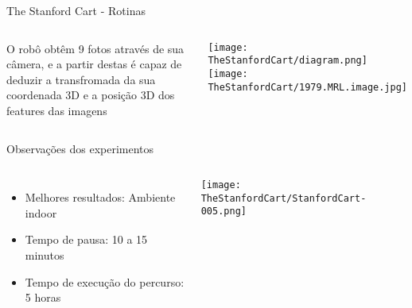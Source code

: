 \begin{frame}[t]{The Stanford Cart - Rotinas}
    \begin{columns}
        O robô obtêm 9 fotos através de sua câmera, e a partir destas é capaz de
        deduzir a transfromada da sua coordenada 3D e a posição 3D dos features das imagens

        \vspace*{0.8cm}
        \texttt{[image: TheStanfordCart/diagram.png]}
        \vspace*{0.3cm}
            \texttt{[image: TheStanfordCart/1979.MRL.image.jpg]}
            \end{columns}
\end{frame}
\begin{frame}[c]{Observações dos experimentos}
    \begin{columns}
        \begin{itemize} 
            \item Melhores resultados: Ambiente indoor
            \item Tempo de pausa: 10 a 15 minutos
            \item Tempo de execução do percurso: 5 horas
        \end{itemize}
            \centering
            \texttt{[image: TheStanfordCart/StanfordCart-005.png]}
            \end{columns}
\end{frame}


